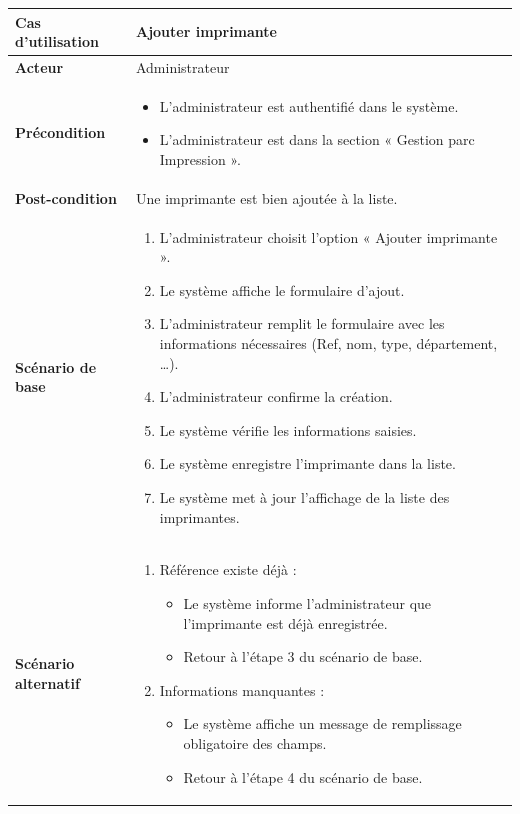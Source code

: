 \documentclass[a4paper,11pt]{report}
\begin{document}
\begin{tabularx}{\textwidth}{|>{\bfseries}l|X|}
\hline
Cas d’utilisation    & Ajouter imprimante \\
\hline
Acteur               & Administrateur \\
\hline
Précondition         &
\begin{itemize}[left=0pt]
  \item L’administrateur est authentifié dans le système.
  \item L’administrateur est dans la section « Gestion parc Impression ».
\end{itemize} \\
\hline
Post-condition       & Une imprimante est bien ajoutée à la liste. \\
\hline
Scénario de base     &
\begin{enumerate}[left=0pt]
  \item L’administrateur choisit l’option « Ajouter imprimante ».
  \item Le système affiche le formulaire d’ajout.
  \item L’administrateur remplit le formulaire avec les informations nécessaires (Ref, nom, type, département, …).
  \item L’administrateur confirme la création.
  \item Le système vérifie les informations saisies.
  \item Le système enregistre l’imprimante dans la liste.
  \item Le système met à jour l’affichage de la liste des imprimantes.
\end{enumerate} \\
\hline
Scénario alternatif  &
\begin{enumerate}[label=\arabic*.a,wide=0pt,leftmargin=0pt]
  \item[5.a] Référence existe déjà :
    \begin{itemize}[leftmargin=1em]
      \item Le système informe l’administrateur que l’imprimante est déjà enregistrée.
      \item Retour à l’étape 3 du scénario de base.
    \end{itemize}
  \item[5.b] Informations manquantes :
    \begin{itemize}[leftmargin=1em]
      \item Le système affiche un message de remplissage obligatoire des champs.
      \item Retour à l’étape 4 du scénario de base.
    \end{itemize}
\end{enumerate} \\
\hline
\end{tabularx}
\end{document}
